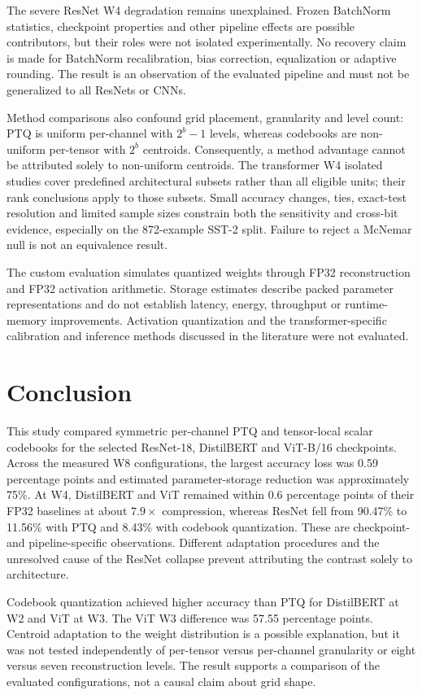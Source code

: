 \documentclass[conference]{IEEEtran}
\begin{document}
The severe ResNet W4 degradation remains unexplained. Frozen BatchNorm statistics, checkpoint properties and other pipeline effects are possible contributors, but their roles were not isolated experimentally. No recovery claim is made for BatchNorm recalibration, bias correction, equalization or adaptive rounding. The result is an observation of the evaluated pipeline and must not be generalized to all ResNets or CNNs.

Method comparisons also confound grid placement, granularity and level count: PTQ is uniform per-channel with $2^b-1$ levels, whereas codebooks are non-uniform per-tensor with $2^b$ centroids. Consequently, a method advantage cannot be attributed solely to non-uniform centroids. The transformer W4 isolated studies cover predefined architectural subsets rather than all eligible units; their rank conclusions apply to those subsets. Small accuracy changes, ties, exact-test resolution and limited sample sizes constrain both the sensitivity and cross-bit evidence, especially on the 872-example SST-2 split. Failure to reject a McNemar null is not an equivalence result.

The custom evaluation simulates quantized weights through FP32 reconstruction and FP32 activation arithmetic. Storage estimates describe packed parameter representations and do not establish latency, energy, throughput or runtime-memory improvements. Activation quantization and the transformer-specific calibration and inference methods discussed in the literature were not evaluated.

\section{Conclusion}

This study compared symmetric per-channel PTQ and tensor-local scalar codebooks for the selected ResNet-18, DistilBERT and ViT-B/16 checkpoints. Across the measured W8 configurations, the largest accuracy loss was 0.59 percentage points and estimated parameter-storage reduction was approximately 75\%. At W4, DistilBERT and ViT remained within 0.6 percentage points of their FP32 baselines at about $7.9\times$ compression, whereas ResNet fell from 90.47\% to 11.56\% with PTQ and 8.43\% with codebook quantization. These are checkpoint- and pipeline-specific observations. Different adaptation procedures and the unresolved cause of the ResNet collapse prevent attributing the contrast solely to architecture.

Codebook quantization achieved higher accuracy than PTQ for DistilBERT at W2 and ViT at W3. The ViT W3 difference was 57.55 percentage points. Centroid adaptation to the weight distribution is a possible explanation, but it was not tested independently of per-tensor versus per-channel granularity or eight versus seven reconstruction levels. The result supports a comparison of the evaluated configurations, not a causal claim about grid shape.
\end{document}

